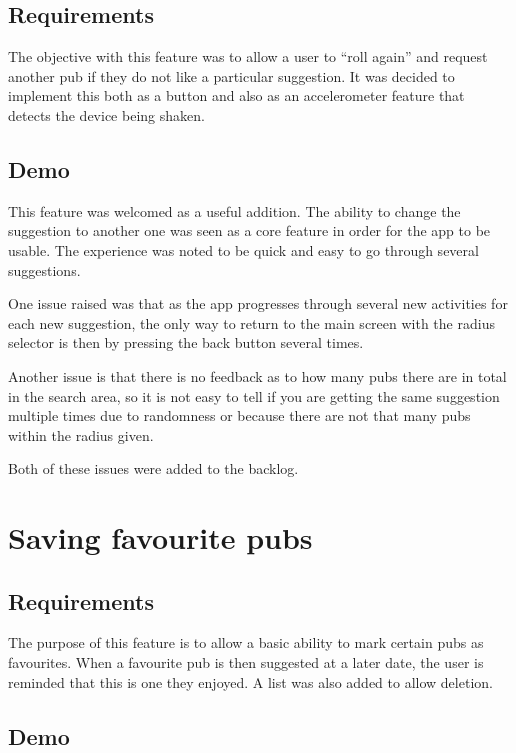 \documentclass{report}
\begin{document}
\subsection{Requirements}

The objective with this feature was to allow a user to ``roll again'' and
request another pub if they do not like a particular suggestion. It was
decided to implement this both as a button and also as an accelerometer
feature that detects the device being shaken.

\subsection{Demo}

This feature was welcomed as a useful addition. The ability to change
the suggestion to another one was seen as a core feature in order
for the app to be usable. The experience was noted to be quick and
easy to go through several suggestions.

One issue raised was that as the app progresses through several new
activities for each new suggestion, the only way to return to the main
screen with the radius selector is then by pressing the back button
several times.

Another issue is that there is no feedback as to how many pubs there are
in total in the search area, so it is not easy to tell if you are
getting the same suggestion multiple times due to randomness or
because there are not that many pubs within the radius given.

Both of these issues were added to the backlog.

\section{Saving favourite pubs}
\subsection{Requirements}

The purpose of this feature is to allow a basic ability to mark certain
pubs as favourites. When a favourite pub is then suggested at a later
date, the user is reminded that this is one they enjoyed. A list
was also added to allow deletion.

\subsection{Demo}
\end{document}
